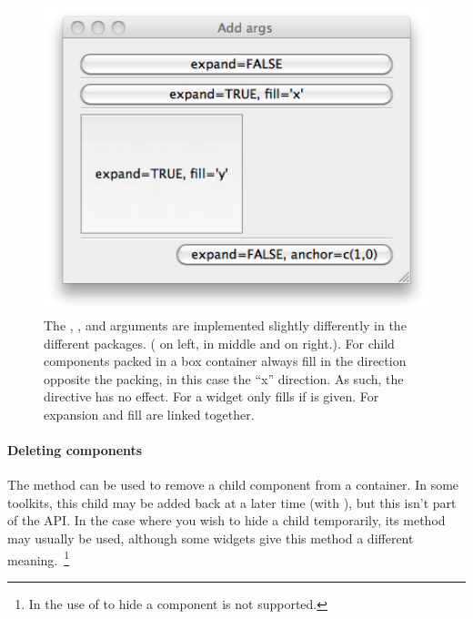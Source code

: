 \begin{figure}
\begin{minipage}[c]{.32\linewidth}
    \includegraphics[width=1\textwidth]{fig-gWidgets-expand-Qt.png}    
  \end{minipage}
  \caption{
    The , , and  arguments are
    implemented slightly differently in the different
    packages. ( on left,  in
    middle and  on right.). For \GTK\/ child
    components packed in a box container always fill in the direction
    opposite the packing, in this case the ``x'' direction. As such,
    the  directive has no effect. For
     a widget only fills if  is given.
    For  expansion and fill are linked together.
  }
  \label{fig:gWidgets-ggroup-expand-fill-anchor}
\end{figure}


\paragraph{Deleting components}
The  method can be used to remove a child
component from a container. In some toolkits, this child may be added
back at a later time (with ), but this isn't part
of the API. In the case where you wish to hide a child temporarily,
its  method may usually be used, although some
widgets give this method a different meaning.~\footnote{In
   the use of  to hide a
  component is not supported.}





